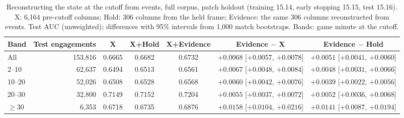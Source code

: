 \begin{table}[!t]
\centering
\caption{Reconstructing the state at the cutoff from events, full corpus, patch holdout (training 15.14,
early stopping 15.15, test 15.16). X: 6,164 pre-cutoff columns; Hold: 306 columns from the held frame;
Evidence: the same 306 columns reconstructed from events. Test AUC (unweighted); differences with 95\%
intervals from 1,000 match bootstraps. Bands: game minute at the cutoff.}
\label{tab:limit-evidence}
\footnotesize
\begin{tabular}{@{}lrccccc@{}}
\toprule
Band & Test engagements & X & X+Hold & X+Evidence & Evidence $-$ X & Evidence $-$ Hold \\
\midrule
All & 153,816 & 0.6665 & 0.6682 & 0.6732 & $+0.0068$ [$+0.0057$, $+0.0078$] & $+0.0051$ [$+0.0041$, $+0.0060$] \\
2--10 & 62,637 & 0.6494 & 0.6513 & 0.6561 & $+0.0067$ [$+0.0048$, $+0.0084$] & $+0.0048$ [$+0.0031$, $+0.0066$] \\
10--20 & 52,026 & 0.6508 & 0.6528 & 0.6568 & $+0.0060$ [$+0.0042$, $+0.0076$] & $+0.0039$ [$+0.0022$, $+0.0056$] \\
20--30 & 32,800 & 0.7149 & 0.7152 & 0.7204 & $+0.0055$ [$+0.0037$, $+0.0072$] & $+0.0052$ [$+0.0036$, $+0.0068$] \\
$\geq 30$ & 6,353 & 0.6718 & 0.6735 & 0.6876 & $+0.0158$ [$+0.0104$, $+0.0216$] & $+0.0141$ [$+0.0087$, $+0.0194$] \\
\bottomrule
\end{tabular}
\end{table}

